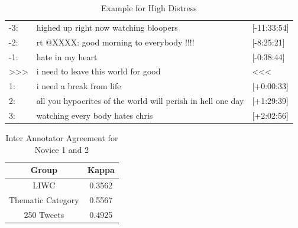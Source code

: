 \documentclass[11pt]{article}
\begin{document}
\begin{table}[h]
\footnotesize
\begin{tabular}{|p{0.8cm}|p{4.25cm}|p{1.2cm}|}
\hline
-3:                                  & highed up right now watching bloopers                                                                                                              & {[}-11:33:54{]}              \\
-2:                                  & rt @XXXX: good morning to everybody !!!!                                                                                                            & {[}-8:25:21{]}              \\
-1:                                  & hate in my heart                                                                                                        & {[}-0:38:44{]}              \\
\textgreater\textgreater\textgreater & i need to leave this world for good  & \textless\textless\textless \\
1:                                   & i need a break from life & {[}+0:00:33{]}              \\
2:                                   & all you hypocrites of the world will perish in hell one day                                                                                                                        & {[}+1:29:39{]}              \\
3:                                   & watching every body hates chris                                                                                                                                           & {[}+2:02:56{]}              \\ \hline
\end{tabular}
\caption{Example for High Distress}
\end{table}

\begin{table}[h]
\centering
\begin{tabular}{|c|c|}
\hline
\textbf{Group}                    & \textbf{Kappa}  \\ \hline
LIWC              & 0.3562 \\ \hline
Thematic Category & 0.5567 \\ \hline
250 Tweets               & 0.4925 \\ \hline
\end{tabular}
\caption {Inter Annotator Agreement for Novice 1 and 2}
\end{table}
\end{document}
